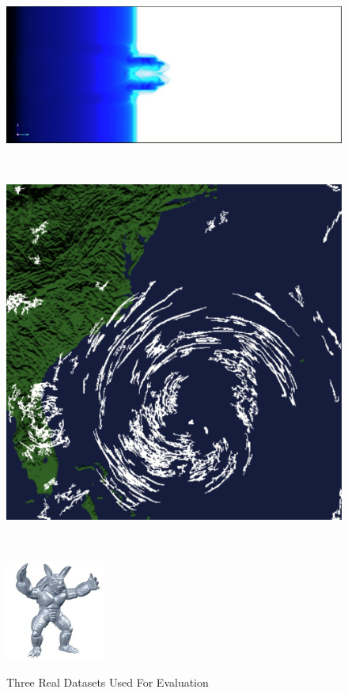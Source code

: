 \begin{figure}
		\begin{center}
			\begin{subfloat}{%
				\includegraphics[scale=0.3]{figures/ionisation_front_instabilities.pdf}
			}
			\end{subfloat}~
			\begin{subfloat}{%
				\includegraphics[scale=0.175]{figures/hurricane_isabel.pdf}
			}
			\end{subfloat}~
			\begin{subfloat} {%
				\includegraphics[scale=1.5]{figures/armadillo.pdf}
			}
			\end{subfloat}			  
		\end{center}

		\caption{Three Real Datasets Used For Evaluation}
		\label{fig:real-data}
\end{figure}

